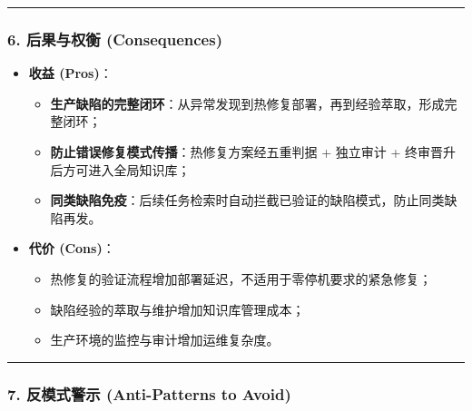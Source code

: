 \begin{center}\rule{0.5\linewidth}{0.5pt}\end{center}

\subsubsection{6. 后果与权衡
(Consequences)}\label{ux540eux679cux4e0eux6743ux8861-consequences-23}

\begin{itemize}
\item
  \textbf{收益 (Pros)}：

  \begin{itemize}
  \item
    \textbf{生产缺陷的完整闭环}：从异常发现到热修复部署，再到经验萃取，形成完整闭环；
  \item
    \textbf{防止错误修复模式传播}：热修复方案经五重判据 + 独立审计 +
    终审晋升后方可进入全局知识库；
  \item
    \textbf{同类缺陷免疫}：后续任务检索时自动拦截已验证的缺陷模式，防止同类缺陷再发。
  \end{itemize}
\item
  \textbf{代价 (Cons)}：

  \begin{itemize}
  \item
    热修复的验证流程增加部署延迟，不适用于零停机要求的紧急修复；
  \item
    缺陷经验的萃取与维护增加知识库管理成本；
  \item
    生产环境的监控与审计增加运维复杂度。
  \end{itemize}
\end{itemize}

\begin{center}\rule{0.5\linewidth}{0.5pt}\end{center}

\subsubsection{7. 反模式警示 (Anti-Patterns to
Avoid)}\label{ux53cdux6a21ux5f0fux8b66ux793a-anti-patterns-to-avoid-23}

